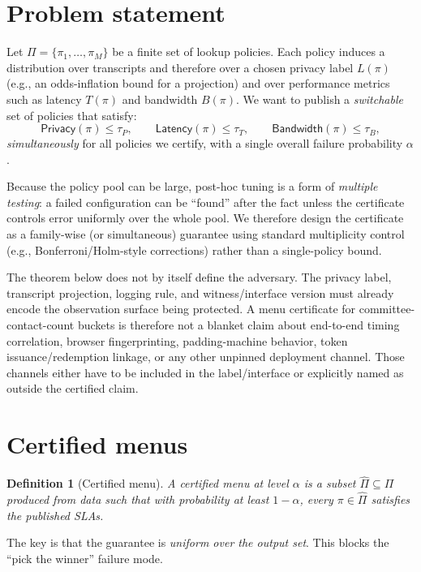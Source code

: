 \documentclass[11pt]{article}
\newtheorem{definition}{Definition}
\begin{document}
\section{Problem statement}
Let $\Pi=\{\pi_1,\dots,\pi_M\}$ be a finite set of lookup policies.
Each policy induces a distribution over transcripts and therefore over a chosen privacy label $L(\pi)$ (e.g., an odds-inflation bound for a projection) and over performance metrics such as latency $T(\pi)$ and bandwidth $B(\pi)$.
We want to publish a \emph{switchable} set of policies that satisfy:
\[
\textsf{Privacy}(\pi)\le \tau_P,\qquad \textsf{Latency}(\pi)\le \tau_T,\qquad \textsf{Bandwidth}(\pi)\le \tau_B,
\]
\emph{simultaneously} for all policies we certify, with a single overall failure probability $\alpha$.

Because the policy pool can be large, post-hoc tuning is a form of \emph{multiple testing}: a failed configuration can be ``found'' after the fact unless the certificate controls error uniformly over the whole pool.
We therefore design the certificate as a family-wise (or simultaneous) guarantee using standard multiplicity control (e.g., Bonferroni/Holm-style corrections) rather than a single-policy bound.\cite{holm1979}

The theorem below does not by itself define the adversary.
The privacy label, transcript projection, logging rule, and witness/interface version must already encode the observation surface being protected.
A menu certificate for committee-contact-count buckets is therefore not a blanket claim about end-to-end timing correlation, browser fingerprinting, padding-machine behavior, token issuance/redemption linkage, or any other unpinned deployment channel.
Those channels either have to be included in the label/interface or explicitly named as outside the certified claim.

\section{Certified menus}
\begin{definition}[Certified menu]
A certified menu at level $\alpha$ is a subset $\widehat\Pi\subseteq\Pi$ produced from data such that with probability at least $1-\alpha$, every $\pi\in\widehat\Pi$ satisfies the published SLAs.
\end{definition}

The key is that the guarantee is \emph{uniform over the output set}.
This blocks the ``pick the winner'' failure mode.
\end{document}
